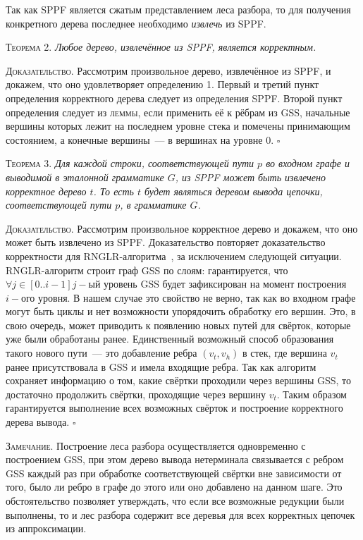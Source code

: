 Так как SPPF является сжатым представлением леса разбора, то для получения конкретного дерева последнее необходимо \textit{извлечь} из SPPF.

\textsc{Теорема 2.} 
\textit{Любое дерево, извлечённое из SPPF, является корректным.}

\textsc{Доказательство.}
Рассмотрим произвольное дерево, извлечённое из SPPF, и докажем, что оно удовлетворяет определению 1. Первый и третий пункт определения корректного дерева следует из определения SPPF. Второй пункт определения следует из \textsc{леммы}, если применить её к рёбрам из GSS, начальные вершины которых лежит на последнем уровне стека и помечены принимающим состоянием, а конечные вершины~--- в вершинах на уровне 0. $\square$

\textsc{Теорема 3.} 
\textit{Для каждой строки, соответствующей пути $p$ во входном графе и выводимой в эталонной грамматике $G$, из SPPF может быть извлечено корректное дерево $t$. То есть $t$ будет являться деревом вывода цепочки, соответствующей пути $p$, в грамматике $G$.}

\textsc{Доказательство.}
Рассмотрим произвольное корректное дерево и докажем, что оно может быть извлечено из SPPF. Доказательство повторяет доказательство корректности для RNGLR-алгоритма~\cite{RNGLR}, за исключением следующей ситуации. RNGLR-алгоритм строит граф GSS по слоям: гарантируется, что $\forall j \in [0..i - 1] j-$ый уровень GSS будет зафиксирован на момент построения $i-$ого уровня. В нашем случае это свойство не верно, так как во входном графе могут быть циклы и нет возможности упорядочить обработку его вершин. Это, в свою очередь, может приводить к появлению новых путей для свёрток, которые уже были обработаны ранее. Единственный возможный способ образования такого нового пути~--- это добавление ребра $(v_{t}, v_{h})$ в стек, где вершина $v_{t}$ ранее присутствовала в GSS и имела входящие ребра. Так как алгоритм сохраняет информацию о том, какие свёртки проходили через вершины GSS, то достаточно продолжить свёртки, проходящие через вершину $v_{t}$. Таким образом гарантируется выполнение всех возможных свёрток и построение корректного дерева вывода. $\square$

\textsc{Замечание.} Построение леса разбора осуществляется одновременно с построением GSS, при этом дерево вывода нетерминала связывается с ребром GSS каждый раз при обработке соответствующей свёртки вне зависимости от того, было ли ребро в графе до этого или оно добавлено на данном шаге. Это обстоятельство позволяет утверждать, что если все возможные редукции были выполнены, то и лес разбора содержит все деревья для всех корректных цепочек из аппроксимации.

